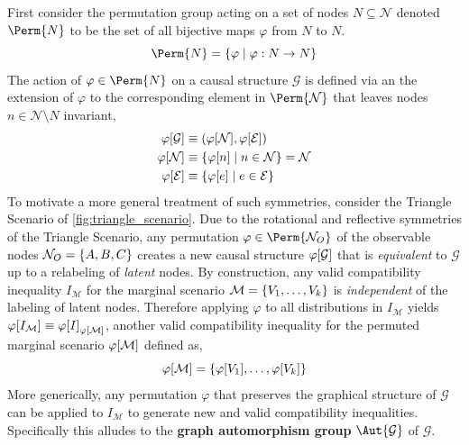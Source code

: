 \documentclass[aps, 10pt, english, twoside, pra, nofootinbib, longbibliography]{revtex4-1}
\theoremstyle{plain}
\theoremstyle{definition}
\newtheorem{example}[theorem]{Example}
\theoremstyle{remark}
\newcommand{\graph}{\mathcal{G}}
\newcommand{\nodes}{\mathcal{N}}
\newcommand{\edges}{\mathcal{E}}
\newcommand{\gep}{\varphi}
\newcommand{\mscenario}{\mathcal{M}}
\newcommand{\term}[1]{\textcolor{Mahogany}{\textbf{#1}}}
\begin{document}
    First consider the permutation group acting on a set of nodes $N \subseteq \nodes$ denoted $\Perm{N}$ to be the set of all bijective maps $\gep$ from $N$ to $N$.
    \[ \Perm{N} = \bc{\gep \mid \gep : N \to N} \]
    The action of $\gep \in \Perm{N}$ on a causal structure $\graph$ is defined via an the extension of $\gep$ to the corresponding element in $\Perm{\nodes}$ that leaves nodes $n \in \nodes \setminus N$ invariant,
    \begin{align*}
    \gep\bs{\graph} &\defined \br{\gep\bs{\nodes}, \gep\bs{\edges}} \\
    \gep\bs{\nodes} &\defined \bc{\gep\bs{n} \mid n \in \nodes} = \nodes \\
    \gep\bs{\edges} &\defined \bc{\gep\bs{e} \mid e \in \edges}
    \end{align*}
    To motivate a more general treatment of such symmetries, consider the Triangle Scenario of \cref{fig:triangle_scenario}. Due to the rotational and reflective symmetries of the Triangle Scenario, any permutation $\gep \in \Perm{\nodes_O}$ of the observable nodes $\nodes_O = \bc{A, B, C}$ creates a new causal structure $\gep\bs{\graph}$ that is \textit{equivalent} to $\graph$ up to a relabeling of \textit{latent} nodes. By construction, any valid compatibility inequality $I_{\mscenario}$ for the marginal scenario $\mscenario = \bc{V_1, \ldots, V_k}$ is \textit{independent} of the labeling of latent nodes. Therefore applying $\gep$ to all distributions in $I_{\mscenario}$ yields $\gep\bs{I_{\mscenario}} \defined \gep\bs{I}_{\gep\bs{\mscenario}}$, another valid compatibility inequality for the permuted marginal scenario $\gep\bs{\mscenario}$ defined as,
    \[ \gep\bs{\mscenario} = \bc{\gep\bs{V_1}, \ldots, \gep\bs{V_k}} \]
    More generically, any permutation $\gep$ that preserves the graphical structure of $\graph$ can be applied to $I_{\mscenario}$ to generate new and valid compatibility inequalities. Specifically this alludes to the \term{graph automorphism group} $\Aut{\graph}$ of $\graph$.
\end{document}
